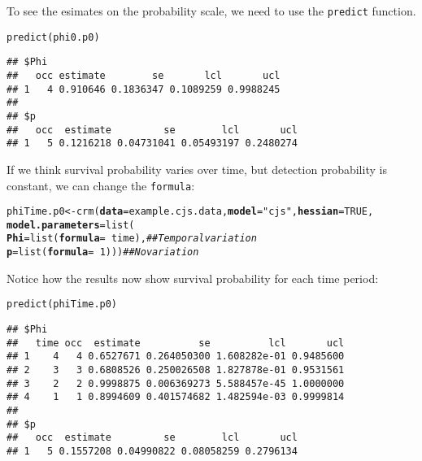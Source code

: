 \documentclass[12pt]{article}\usepackage[]{graphicx}\usepackage[]{xcolor}
\makeatletter
\newcommand{\hlnum}[1]{\textcolor[rgb]{0.69,0.494,0}{#1}}%
\newcommand{\hlsng}[1]{\textcolor[rgb]{0.749,0.012,0.012}{#1}}%
\newcommand{\hlcom}[1]{\textcolor[rgb]{0.514,0.506,0.514}{\textit{#1}}}%
\newcommand{\hlopt}[1]{\textcolor[rgb]{0,0,0}{#1}}%
\newcommand{\hldef}[1]{\textcolor[rgb]{0,0,0}{#1}}%
\newcommand{\hlkwb}[1]{\textcolor[rgb]{0,0.341,0.682}{#1}}%
\newcommand{\hlkwc}[1]{\textcolor[rgb]{0,0,0}{\textbf{#1}}}%
\newcommand{\hlkwd}[1]{\textcolor[rgb]{0.004,0.004,0.506}{#1}}%
\newenvironment{kframe}{%
 \def\at@end@of@kframe{}%
 \ifinner\ifhmode%
  \def\at@end@of@kframe{\end{minipage}}%
  \begin{minipage}{\columnwidth}%
 \fi\fi%
 \def\FrameCommand##1{\hskip\@totalleftmargin \hskip-\fboxsep
 \colorbox{shadecolor}{##1}\hskip-\fboxsep
     \hskip-\linewidth \hskip-\@totalleftmargin \hskip\columnwidth}%
 \MakeFramed {\advance\hsize-\width
   \@totalleftmargin\z@ \linewidth\hsize
   \@setminipage}}%
 {\par\unskip\endMakeFramed%
 \at@end@of@kframe}
\newenvironment{knitrout}{}{} %
\newcommand{\inr}[1]{\colorbox{inlinecolor}{\texttt{#1}}}
\makeatother
\begin{document}
To see the esimates on the probability scale, we need to use the
\inr{predict} function.

\begin{knitrout}
\color{fgcolor}\begin{kframe}
\begin{alltt}
\hlkwd{predict}\hldef{(phi0.p0)}
\end{alltt}
\begin{verbatim}
## $Phi
##   occ estimate        se       lcl       ucl
## 1   4 0.910646 0.1836347 0.1089259 0.9988245
## 
## $p
##   occ  estimate         se        lcl       ucl
## 1   5 0.1216218 0.04731041 0.05493197 0.2480274
\end{verbatim}
\end{kframe}
\end{knitrout}


If we think survival probability varies over time, but detection
probability is constant, we can change the \texttt{formula}:


\begin{knitrout}
\color{fgcolor}\begin{kframe}
\begin{alltt}
\hldef{phiTime.p0} \hlkwb{<-} \hlkwd{crm}\hldef{(}\hlkwc{data}\hldef{=example.cjs.data,} \hlkwc{model}\hldef{=}\hlsng{"cjs"}\hldef{,} \hlkwc{hessian}\hldef{=}\hlnum{TRUE}\hldef{,}
                  \hlkwc{model.parameters}\hldef{=}\hlkwd{list}\hldef{(}
                      \hlkwc{Phi}\hldef{=}\hlkwd{list}\hldef{(}\hlkwc{formula}\hldef{=}\hlopt{~}\hldef{time),}  \hlcom{## Temporal variation}
                      \hlkwc{p}\hldef{=}\hlkwd{list}\hldef{(}\hlkwc{formula}\hldef{=}\hlopt{~}\hlnum{1}\hldef{)))}      \hlcom{## No variation}
\end{alltt}
\end{kframe}
\end{knitrout}

Notice how the results now show survival probability for each time period:

\begin{knitrout}
\color{fgcolor}\begin{kframe}
\begin{alltt}
\hlkwd{predict}\hldef{(phiTime.p0)}
\end{alltt}
\begin{verbatim}
## $Phi
##   time occ  estimate          se          lcl       ucl
## 1    4   4 0.6527671 0.264050300 1.608282e-01 0.9485600
## 2    3   3 0.6808526 0.250026508 1.827878e-01 0.9531561
## 3    2   2 0.9998875 0.006369273 5.588457e-45 1.0000000
## 4    1   1 0.8994609 0.401574682 1.482594e-03 0.9999814
## 
## $p
##   occ  estimate         se        lcl       ucl
## 1   5 0.1557208 0.04990822 0.08058259 0.2796134
\end{verbatim}
\end{kframe}
\end{knitrout}
\end{document}
